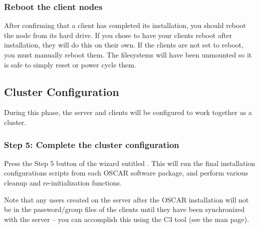 
\subsubsection{Reboot the client nodes}

After confirming that a client has completed its installation, you
should reboot the node from its hard drive. If you chose to have your
clients reboot after installation, they will do this on their
own. If the clients are not set to reboot, you must manually
reboot them. The filesystems will have been unmounted so it is safe
to simply reset or power cycle them.



\subsection{Cluster Configuration}

During this phase, the server and clients will be configured to work
together as a cluster.


\subsubsection{Step 5: Complete the cluster configuration}
\label{det:completeinstall}

Press the Step 5 button of the wizard entitled .  This will run the final installation configurations
scripts from each OSCAR software package, and perform various cleanup
and re-initialization functions.

Note that any users created on the server after the OSCAR installation
will not be in the password/group files of the clients until they have
been synchronized with the server -- you can accomplish this using the C3
 tool (see the  man page).



